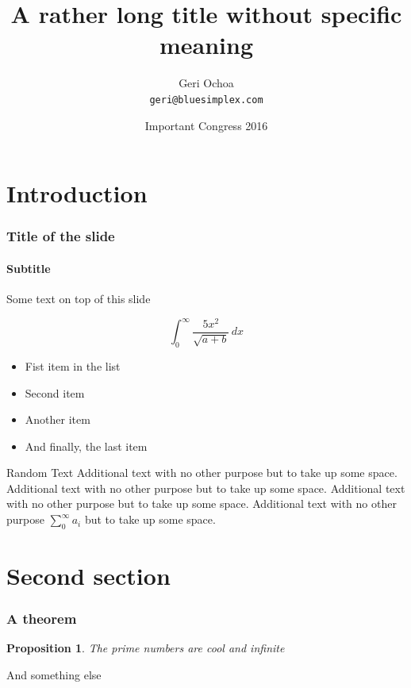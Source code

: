 \documentclass{beamer}
\title{A rather long title without specific meaning}
\author{Geri Ochoa\\ %
  \texttt{geri@bluesimplex.com}} %
\date{Important Congress 2016} %
\institute{Institute of Mathematics, Great University} %
\newtheorem{proposition}{Proposition}
\begin{document}
  \begin{frame}

    \titlepage %

  \end{frame}

  \begin{frame}
    \tableofcontents %
  \end{frame}

  \section{Introduction} %
  \begin{frame}
    \frametitle{Title of the slide}
    \framesubtitle{Subtitle} %
    Some text on top of this slide

    \[
      \int_{0}^{\infty} \frac{5x^2}{\sqrt{a+b}}\, dx
    \]

    \begin{itemize}
      \item[\checkmark] Fist item in the list %
      \item Second item
      \item Another item
      \item And finally, the last item
    \end{itemize}
  \end{frame}

  \begin{frame}{Random Text} %
    Additional text with no other purpose but to take up some space.
    Additional text with no other purpose but to take up some space.
    Additional text with no other purpose but to take up some space.
    Additional text with no other purpose
    \( \sum_0^{\infty} a_i \)
    but to take up some space.
  \end{frame}

  \section{Second section} %
  \begin{frame}
    \frametitle{A theorem}

    \begin{proposition} %
      The prime numbers are cool and infinite
    \end{proposition}

    And something else

  \end{frame}
\end{document}
